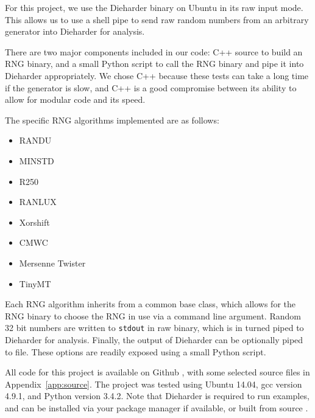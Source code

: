For this project, we use the Dieharder binary on Ubuntu in its raw input mode. This allows us to use a shell pipe to send raw random numbers from an arbitrary generator into Dieharder for analysis.

There are two major components included in our code: C++ source to build an RNG binary, and a small Python script to call the RNG binary and pipe it into Dieharder appropriately. We chose C++ because these tests can take a long time if the generator is slow, and C++ is a good compromise between its ability to allow for modular code and its speed.

The specific RNG algorithms implemented are as follows:
\begin{itemize}
    \item RANDU
    \item MINSTD
    \item R250
    \item RANLUX
    \item Xorshift
    \item CMWC
    \item Mersenne Twister
    \item TinyMT
\end{itemize}
Each RNG algorithm inherits from a common base class, which allows for the RNG binary to choose the RNG in use via a command line argument. Random 32 bit numbers are written to \texttt{stdout} in raw binary, which is in turned piped to Dieharder for analysis. Finally, the output of Dieharder can be optionally piped to file. These options are readily exposed using a small Python script.

All code for this project is available on Github \cite{github_repo}, with some selected source files in Appendix~\ref{app:source}. The project was tested using Ubuntu 14.04, gcc version 4.9.1, and Python version 3.4.2. Note that Dieharder is required to run examples, and can be installed via your package manager if available, or built from source \cite{dieharder_website}.
